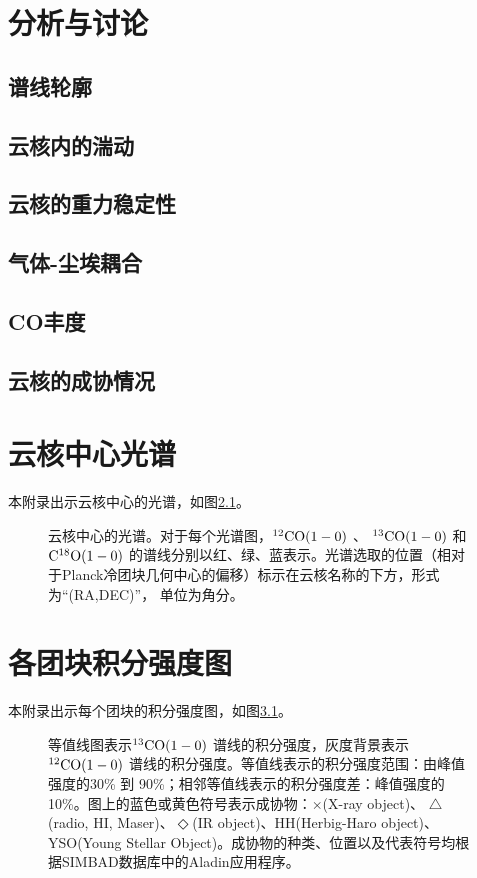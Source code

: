 \documentclass[UTF8, nocolorlinks]{pkuthss}
\newcommand{\coaa}{$\rm^{12}CO(1-0)$ }
\newcommand{\cobb}{$\rm^{13}CO(1-0)$ }
\newcommand{\cocc}{$\rm C^{18}O(1-0)$ }
\begin{document}
\chapter{分析与讨论}
	\section{谱线轮廓}
	\section{云核内的湍动}
	\section{云核的重力稳定性}
	\section{气体-尘埃耦合}
	\section{CO丰度}
	\section{云核的成协情况}

\appendix %

\printbibliography[heading = bibintoc]

\chapter{云核中心光谱}\label{App.Spectra}
	本附录出示云核中心的光谱，如图\ref{Fig.Spectra}。

	\begin{figure}[h]
		\caption{云核中心的光谱。对于每个光谱图，\coaa 、 \cobb 和 \cocc   的谱线分别以红、绿、蓝表示。光谱选取的位置（相对于Planck冷团块几何中心的偏移）标示在云核名称的下方，形式为“(RA,DEC)”， 单位为角分。\label{Fig.Spectra}}
	\end{figure}
		\vspace{-18mm}

\chapter{各团块积分强度图}\label{App.Map}
	
	本附录出示每个团块的积分强度图，如图\ref{Fig.Map}。

	\begin{figure}[h]
		\caption{等值线图表示\cobb 谱线的积分强度，灰度背景表示\coaa 谱线的积分强度。等值线表示的积分强度范围：由峰值强度的30\% 到 90\%；相邻等值线表示的积分强度差：峰值强度的10\%。图上的蓝色或黄色符号表示成协物：$\times$(X-ray object)、 $\triangle$(radio, {HI}, Maser)、$\Diamond$(IR object)、HH(Herbig-Haro object)、YSO(Young Stellar Object)。成协物的种类、位置以及代表符号均根据SIMBAD数据库中的Aladin应用程序。\label{Fig.Map}}
	\end{figure}
		\vspace{-18mm}

\backmatter


\end{document}
